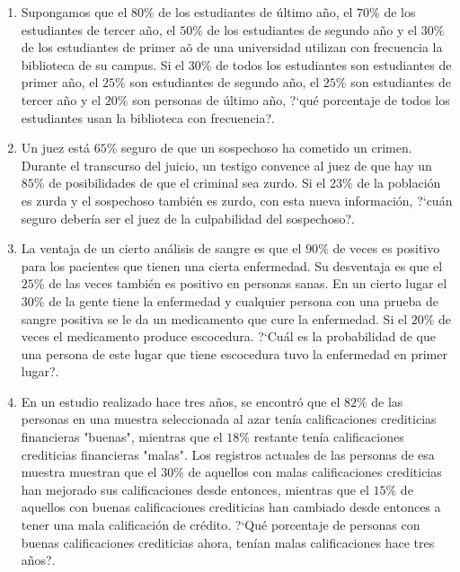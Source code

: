 \documentclass[a4paper,10pt]{report}
\begin{document}
\begin{enumerate}
\item Supongamos que el $80\%$ de los estudiantes de \'ultimo a\~no, el $70\%$ de los estudiantes de tercer a\~no, el $50\%$ de los estudiantes de segundo a\~no y el $30\%$ de los estudiantes de primer a\~o de una universidad utilizan con frecuencia la biblioteca de su campus. Si el $30\%$ de todos los estudiantes son estudiantes de primer a\~no, el $25\%$ son estudiantes de segundo a\~no, el $25\%$ son estudiantes de tercer a\~no y el $20\%$ son personas de \'ultimo a\~no, ?`qu\'e porcentaje de todos los estudiantes usan la biblioteca con frecuencia?.

\item Un juez est\'a $65\%$ seguro de que un sospechoso ha cometido un crimen. Durante el transcurso del juicio, un testigo convence al juez de que hay un $85\%$ de posibilidades de que el criminal sea zurdo. Si el $23\%$ de la poblaci\'on es zurda y el sospechoso tambi\'en es zurdo, con esta nueva informaci\'on, ?`cu\'an seguro deber\'ia ser el juez de la culpabilidad del sospechoso?.

\item La ventaja de un cierto an\'alisis de sangre es que el $90\%$ de veces es positivo para los pacientes que tienen una cierta enfermedad. Su desventaja es que el $25\%$ de las veces tambi\'en es positivo en personas sanas. En un cierto lugar el $30\%$ de la gente tiene la enfermedad y cualquier persona con una prueba de sangre positiva se le da un medicamento que cure la enfermedad. Si el $20\%$ de veces el medicamento produce escocedura. ?`Cu\'al es la probabilidad de que una persona de este lugar que tiene escocedura tuvo la enfermedad en primer lugar?.

\item En un estudio realizado hace tres a\~nos, se encontr\'o que el $82\%$ de las personas en una muestra seleccionada al azar ten\'ia calificaciones crediticias financieras "buenas", mientras que el $18\%$ restante ten\'ia calificaciones crediticias financieras "malas". Los registros actuales de las personas de esa muestra muestran que el $30\%$ de aquellos con malas calificaciones crediticias han mejorado sus calificaciones desde entonces, mientras que el $15\%$ de aquellos con buenas calificaciones crediticias han cambiado desde entonces a tener una mala calificaci\'on de cr\'edito. ?`Qu\'e porcentaje de personas con buenas calificaciones crediticias ahora, ten\'ian malas calificaciones hace tres a\~nos?.

\end{enumerate}
\vspace{0.5cm}
\end{document}
